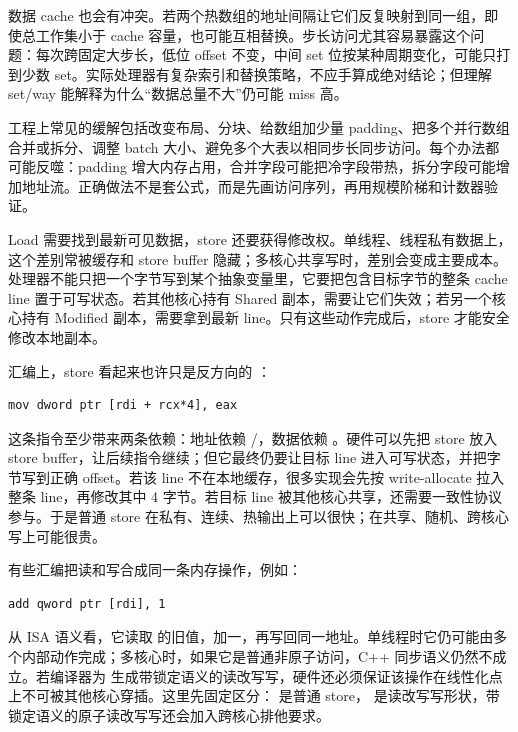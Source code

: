 数据 cache 也会有冲突。若两个热数组的地址间隔让它们反复映射到同一组，即使总工作集小于 cache 容量，也可能互相替换。步长访问尤其容易暴露这个问题：每次跨固定大步长，低位 offset 不变，中间 set 位按某种周期变化，可能只打到少数 set。实际处理器有复杂索引和替换策略，不应手算成绝对结论；但理解 set/way 能解释为什么“数据总量不大”仍可能 miss 高。

工程上常见的缓解包括改变布局、分块、给数组加少量 padding、把多个并行数组合并或拆分、调整 batch 大小、避免多个大表以相同步长同步访问。每个办法都可能反噬：padding 增大内存占用，合并字段可能把冷字段带热，拆分字段可能增加地址流。正确做法不是套公式，而是先画访问序列，再用规模阶梯和计数器验证。

Load 需要找到最新可见数据，store 还要获得修改权。单线程、线程私有数据上，这个差别常被缓存和 store buffer 隐藏；多核心共享写时，差别会变成主要成本。处理器不能只把一个字节写到某个抽象变量里，它要把包含目标字节的整条 cache line 置于可写状态。若其他核心持有 Shared 副本，需要让它们失效；若另一个核心持有 Modified 副本，需要拿到最新 line。只有这些动作完成后，store 才能安全修改本地副本。

汇编上，store 看起来也许只是反方向的 ：

\begin{lstlisting}[numbers=none,caption={普通 store 的汇编形状}]
mov dword ptr [rdi + rcx*4], eax
\end{lstlisting}

这条指令至少带来两条依赖：地址依赖 /，数据依赖 。硬件可以先把 store 放入 store buffer，让后续指令继续；但它最终仍要让目标 line 进入可写状态，并把字节写到正确 offset。若该 line 不在本地缓存，很多实现会先按 write-allocate 拉入整条 line，再修改其中 4 字节。若目标 line 被其他核心共享，还需要一致性协议参与。于是普通 store 在私有、连续、热输出上可以很快；在共享、随机、跨核心写上可能很贵。

有些汇编把读和写合成同一条内存操作，例如：

\begin{lstlisting}[numbers=none,caption={内存读改写写的汇编形状}]
add qword ptr [rdi], 1
\end{lstlisting}

从 ISA 语义看，它读取 \code{[rdi]} 的旧值，加一，再写回同一地址。单线程时它仍可能由多个内部动作完成；多核心时，如果它是普通非原子访问，C++ 同步语义仍然不成立。若编译器为  生成带锁定语义的读改写写，硬件还必须保证该操作在线性化点上不可被其他核心穿插。这里先固定区分： 是普通 store， 是读改写写形状，带锁定语义的原子读改写写还会加入跨核心排他要求。

